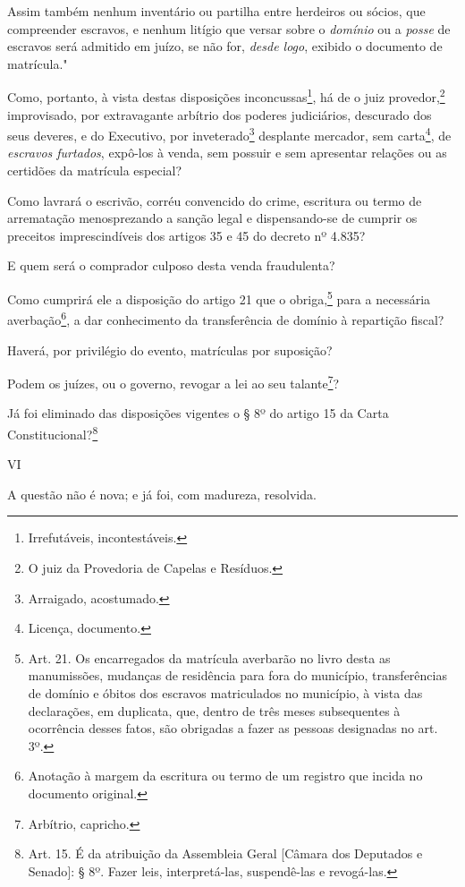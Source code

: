 Assim também nenhum inventário ou partilha entre herdeiros ou sócios,
que compreender escravos, e nenhum litígio que versar sobre o
\emph{domínio} ou a \emph{posse} de escravos será admitido em juízo, se
não for, \emph{desde logo}, exibido o documento de matrícula."

Como, portanto, à vista destas disposições inconcussas\footnote{
  Irrefutáveis, incontestáveis.}, há de o juiz provedor,\footnote{O
  juiz da Provedoria de Capelas e Resíduos.} improvisado, por
extravagante arbítrio dos poderes judiciários, descurado dos seus
deveres, e do Executivo, por inveterado\footnote{Arraigado,
  acostumado.} desplante mercador, sem carta\footnote{Licença,
  documento.}, de \emph{escravos furtados}, expô-los à venda, sem
possuir e sem apresentar relações ou as certidões da matrícula especial?

Como lavrará o escrivão, corréu convencido do crime, escritura ou termo
de arrematação menosprezando a sanção legal e dispensando-se de cumprir
os preceitos imprescindíveis dos artigos 35 e 45 do decreto nº 4.835?

E quem será o comprador culposo desta venda fraudulenta?

Como cumprirá ele a disposição do artigo 21 que o obriga,\footnote{
  Art. 21. Os encarregados da matrícula averbarão no livro desta as
  manumissões, mudanças de residência para fora do município,
  transferências de domínio e óbitos dos escravos matriculados no
  município, à vista das declarações, em duplicata, que, dentro de três
  meses subsequentes à ocorrência desses fatos, são obrigadas a fazer as
  pessoas designadas no art. 3º.} para a necessária averbação\footnote{
  Anotação à margem da escritura ou termo de um registro que incida no
  documento original.}, a dar conhecimento da transferência de domínio à
repartição fiscal?

Haverá, por privilégio do evento, matrículas por suposição?

Podem os juízes, ou o governo, revogar a lei ao seu talante\footnote{
  Arbítrio, capricho.}?

Já foi eliminado das disposições vigentes o § 8º do artigo 15 da Carta
Constitucional?\footnote{Art. 15. É da atribuição da Assembleia Geral
  {[}Câmara dos Deputados e Senado{]}: § 8º. Fazer leis, interpretá-las,
  suspendê-las e revogá-las.}

VI

A questão não é nova; e já foi, com madureza, resolvida.

